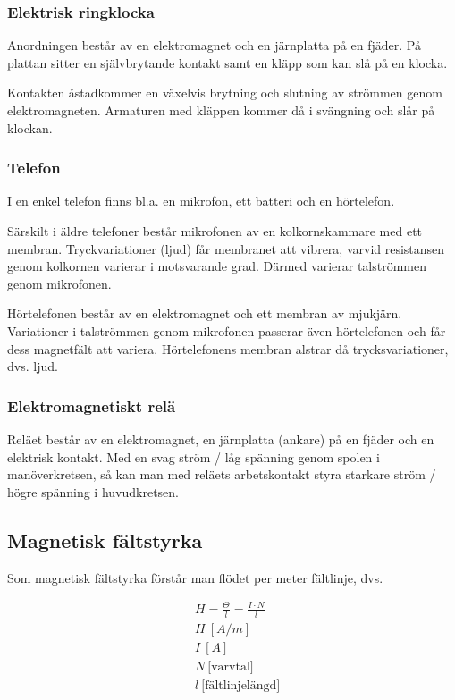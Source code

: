 \subsubsection{Elektrisk ringklocka}
Anordningen består av en elektromagnet och en järnplatta på en fjäder.
På plattan sitter en självbrytande kontakt samt en kläpp som kan slå på en
klocka.

Kontakten åstadkommer en växelvis brytning och slutning av strömmen genom
elektromagneten.
Armaturen med kläppen kommer då i svängning och slår på klockan.

\subsubsection{Telefon}
I en enkel telefon finns bl.a. en mikrofon, ett batteri och en hörtelefon.

Särskilt i äldre telefoner består mikrofonen av en kolkornskammare med ett
membran.
Tryckvariationer (ljud) får membranet att vibrera, varvid resistansen genom
kolkornen varierar i motsvarande grad.
Därmed varierar talströmmen genom mikrofonen.

Hörtelefonen består av en elektromagnet och ett membran av mjukjärn.
Variationer i talströmmen genom mikrofonen passerar även hörtelefonen och får dess
magnetfält att variera.
Hörtelefonens membran alstrar då trycksvariationer, dvs. ljud.

\subsubsection{Elektromagnetiskt relä}
Reläet består av en elektromagnet, en järnplatta (ankare) på en fjäder och en
elektrisk kontakt.
Med en svag ström / låg spänning genom spolen i manöverkretsen, så kan man med
reläets arbetskontakt styra starkare ström / högre spänning i huvudkretsen.

\subsection{Magnetisk fältstyrka}

Som magnetisk fältstyrka förstår man flödet per meter fältlinje, dvs.

\begin{align*}
  &H = \frac{\Theta}{l} = \frac{I \cdot N}{l} \\
  &H\ [A/m] \\
  &I\ [A] \\
  &N\ \text{[varvtal]} \\
  &l\ \text{[fältlinjelängd]}
\end{align*}

